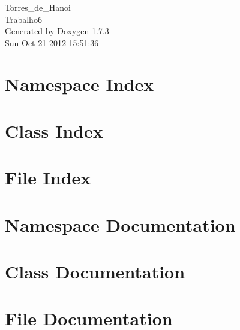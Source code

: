 \documentclass[a4paper]{book}
\begin{document}
\hypersetup{pageanchor=false}
\begin{titlepage}
\vspace*{7cm}
\begin{center}
{\Large Torres\_\-de\_\-Hanoi \\[1ex]\large Trabalho6 }\\
\vspace*{1cm}
{\large Generated by Doxygen 1.7.3}\\
\vspace*{0.5cm}
{\small Sun Oct 21 2012 15:51:36}\\
\end{center}
\end{titlepage}
\clearemptydoublepage
{}
\tableofcontents
\clearemptydoublepage
{}
\hypersetup{pageanchor=true}
\chapter{Namespace Index}

\chapter{Class Index}

\chapter{File Index}

\chapter{Namespace Documentation}

\chapter{Class Documentation}



\chapter{File Documentation}







\printindex
\end{document}
